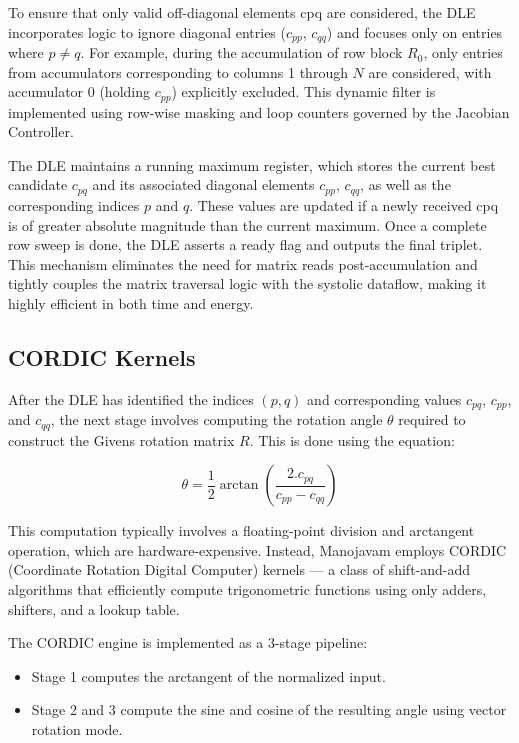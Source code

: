 To ensure that only valid off-diagonal elements cpq are considered, the DLE incorporates logic to ignore diagonal entries ($c_{pp}$, $c_{qq}$) and focuses only on entries where $p \neq q$. For example, during the accumulation of row block $R_{0}$, only entries from accumulators corresponding to columns 1 through $N$ are considered, with accumulator 0 (holding $c_{pp}$) explicitly excluded. This dynamic filter is implemented using row-wise masking and loop counters governed by the Jacobian Controller.

The DLE maintains a running maximum register, which stores the current best candidate $c_{pq}$ and its associated diagonal elements $c_{pp}$, $c_{qq}$, as well as the corresponding indices $p$ and $q$. These values are updated if a newly received cpq is of greater absolute magnitude than the current maximum. Once a complete row sweep is done, the DLE asserts a ready flag and outputs the final triplet. This mechanism eliminates the need for matrix reads post-accumulation and tightly couples the matrix traversal logic with the systolic dataflow, making it highly efficient in both time and energy.

\subsection{CORDIC Kernels}
After the DLE has identified the indices $(p, q)$ and corresponding values $c_{pq}$, $c_{pp}$, and $c_{qq}$, the next stage involves computing the rotation angle $\theta$ required to construct the Givens rotation matrix $R$. This is done using the equation:

\begin{equation}
	\theta = \frac{1}{2}\arctan(\frac{2.c_{pq}}{c_{pp} - c_{qq}})
	\label{eq:rotation-angle-equation}
\end{equation}

This computation typically involves a floating-point division and arctangent operation, which are hardware-expensive. Instead, Manojavam employs CORDIC (Coordinate Rotation Digital Computer) kernels — a class of shift-and-add algorithms that efficiently compute trigonometric functions using only adders, shifters, and a lookup table.

The CORDIC engine is implemented as a 3-stage pipeline:
\begin{itemize}
	\item Stage 1 computes the arctangent of the normalized input.
	\item Stage 2 and 3 compute the sine and cosine of the resulting angle using vector rotation mode. 
\end{itemize}

